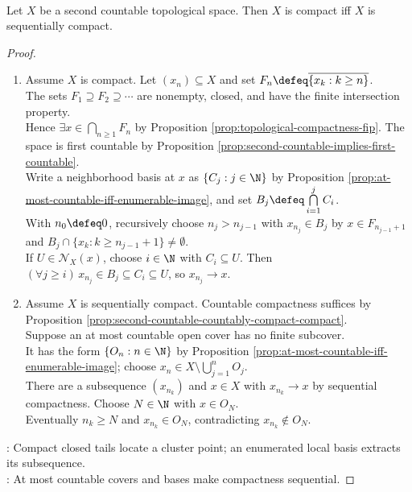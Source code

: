 \begin{theorem} \label{thm:second-countable-compact-iff-sequentially-compact} \\
Let $X$ be a second countable topological space. Then $X$ is compact iff $X$ is sequentially compact.
\begin{proof}
\begin{enumerate}[label=\roman*.]
\setlength{\itemsep}{0pt}
\item[$(\Rightarrow)$] Assume $X$ is compact. Let $(x_n)\subseteq X$ and set $F_n\defeq\overline{\{x_k:k\geq n\}}$.\\
The sets $F_1\supseteq F_2\supseteq\cdots$ are nonempty, closed, and have the finite intersection property.\\
Hence $\exists x\in\bigcap\limits_{n\geq1}F_n$ by Proposition \ref{prop:topological-compactness-fip}. The space is first countable by Proposition \ref{prop:second-countable-implies-first-countable}.\\
Write a neighborhood basis at $x$ as $\{C_j:j\in\N\}$ by Proposition \ref{prop:at-most-countable-iff-enumerable-image}, and set $B_j\defeq\bigcap\limits_{i=1}^jC_i$.\\
With $n_0\defeq0$, recursively choose $n_j>n_{j-1}$ with $x_{n_j}\in B_j$ by $x\in F_{n_{j-1}+1}$ and $B_j\cap\{x_k:k\geq n_{j-1}+1\}\neq\emptyset$.\\
If $U\in\mathcal{N}_X(x)$, choose $i\in\N$ with $C_i\subseteq U$. Then $(\forall j\geq i)\,x_{n_j}\in B_j\subseteq C_i\subseteq U$, so $x_{n_j}\to x$.
\item[$(\Leftarrow)$] Assume $X$ is sequentially compact. Countable compactness suffices by Proposition \ref{prop:second-countable-countably-compact-compact}.\\
Suppose an at most countable open cover has no finite subcover.\\
It has the form $\{O_n:n\in\N\}$ by Proposition \ref{prop:at-most-countable-iff-enumerable-image}; choose $x_n\in X\setminus\bigcup\limits_{j=1}^n O_j$.\\
There are a subsequence $(x_{n_k})$ and $x\in X$ with $x_{n_k}\to x$ by sequential compactness. Choose $N\in\N$ with $x\in O_N$.\\
Eventually $n_k\geq N$ and $x_{n_k}\in O_N$, contradicting $x_{n_k}\notin O_N$.
\end{enumerate}
: Compact closed tails locate a cluster point; an enumerated local basis extracts its subsequence.\\
: At most countable covers and bases make compactness sequential.
\end{proof}
\end{theorem}

